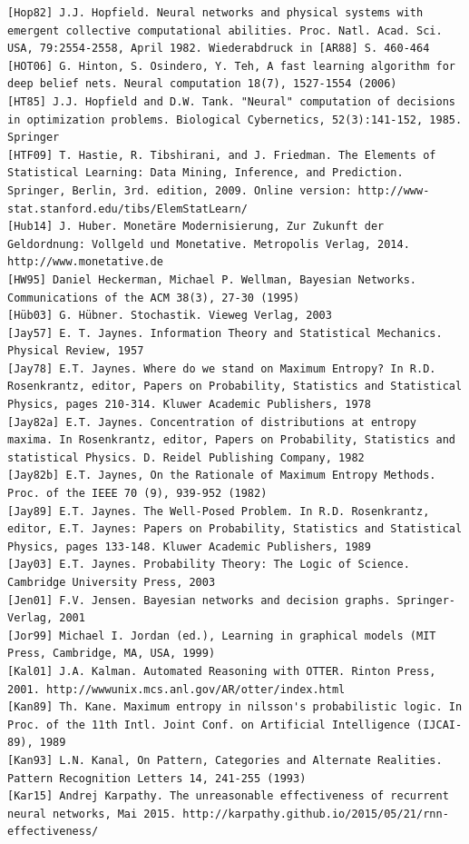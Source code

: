 \documentclass[10pt]{article}
\begin{document}
\begin{verbatim}
[Hop82] J.J. Hopfield. Neural networks and physical systems with emergent collective computational abilities. Proc. Natl. Acad. Sci. USA, 79:2554-2558, April 1982. Wiederabdruck in [AR88] S. 460-464
[HOT06] G. Hinton, S. Osindero, Y. Teh, A fast learning algorithm for deep belief nets. Neural computation 18(7), 1527-1554 (2006)
[HT85] J.J. Hopfield and D.W. Tank. "Neural" computation of decisions in optimization problems. Biological Cybernetics, 52(3):141-152, 1985. Springer
[HTF09] T. Hastie, R. Tibshirani, and J. Friedman. The Elements of Statistical Learning: Data Mining, Inference, and Prediction. Springer, Berlin, 3rd. edition, 2009. Online version: http://www-stat.stanford.edu/tibs/ElemStatLearn/
[Hub14] J. Huber. Monetäre Modernisierung, Zur Zukunft der Geldordnung: Vollgeld und Monetative. Metropolis Verlag, 2014. http://www.monetative.de
[HW95] Daniel Heckerman, Michael P. Wellman, Bayesian Networks. Communications of the ACM 38(3), 27-30 (1995)
[Hüb03] G. Hübner. Stochastik. Vieweg Verlag, 2003
[Jay57] E. T. Jaynes. Information Theory and Statistical Mechanics. Physical Review, 1957
[Jay78] E.T. Jaynes. Where do we stand on Maximum Entropy? In R.D. Rosenkrantz, editor, Papers on Probability, Statistics and Statistical Physics, pages 210-314. Kluwer Academic Publishers, 1978
[Jay82a] E.T. Jaynes. Concentration of distributions at entropy maxima. In Rosenkrantz, editor, Papers on Probability, Statistics and statistical Physics. D. Reidel Publishing Company, 1982
[Jay82b] E.T. Jaynes, On the Rationale of Maximum Entropy Methods. Proc. of the IEEE 70 (9), 939-952 (1982)
[Jay89] E.T. Jaynes. The Well-Posed Problem. In R.D. Rosenkrantz, editor, E.T. Jaynes: Papers on Probability, Statistics and Statistical Physics, pages 133-148. Kluwer Academic Publishers, 1989
[Jay03] E.T. Jaynes. Probability Theory: The Logic of Science. Cambridge University Press, 2003
[Jen01] F.V. Jensen. Bayesian networks and decision graphs. Springer-Verlag, 2001
[Jor99] Michael I. Jordan (ed.), Learning in graphical models (MIT Press, Cambridge, MA, USA, 1999)
[Kal01] J.A. Kalman. Automated Reasoning with OTTER. Rinton Press, 2001. http://wwwunix.mcs.anl.gov/AR/otter/index.html
[Kan89] Th. Kane. Maximum entropy in nilsson's probabilistic logic. In Proc. of the 11th Intl. Joint Conf. on Artificial Intelligence (IJCAI-89), 1989
[Kan93] L.N. Kanal, On Pattern, Categories and Alternate Realities. Pattern Recognition Letters 14, 241-255 (1993)
[Kar15] Andrej Karpathy. The unreasonable effectiveness of recurrent neural networks, Mai 2015. http://karpathy.github.io/2015/05/21/rnn-effectiveness/

\end{verbatim}
\end{document}
